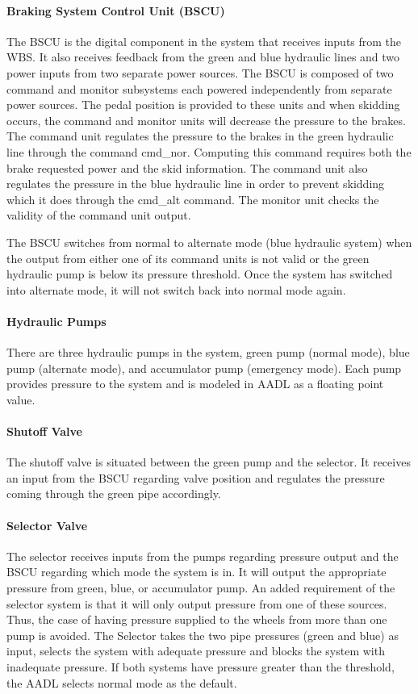 \paragraph{Braking System Control Unit (BSCU)}
The BSCU is the digital component in the system that receives inputs from the WBS. It also receives feedback from the green and blue hydraulic lines and two power inputs from two separate power sources. The BSCU is composed of two command and monitor subsystems each powered independently from separate power sources. The pedal position is provided to these units and when skidding occurs, the command and monitor units will decrease the pressure to the brakes.
The command unit regulates the pressure to the brakes in the green hydraulic line through the command cmd\_nor. Computing this command requires both the brake requested power and the skid information. The command unit also regulates the pressure in the blue hydraulic line in order to prevent skidding which it does through the cmd\_alt command. The monitor unit checks the validity of the command unit output.

The BSCU switches from normal to alternate mode (blue hydraulic system) when the output from either one of its command units is not valid or the green hydraulic pump is below its pressure threshold.  Once the system has switched into alternate mode, it will not switch back into normal mode again.

\paragraph{Hydraulic Pumps}
There are three hydraulic pumps in the system, green pump (normal mode), blue pump (alternate mode), and accumulator pump (emergency mode). Each pump provides pressure to the system and is modeled in AADL as a floating point value.

\paragraph{Shutoff Valve}

The shutoff valve is situated between the green pump and the selector. It receives an input from the BSCU regarding valve position and regulates the pressure coming through the green pipe accordingly.

\paragraph{Selector Valve}
The selector receives inputs from the pumps regarding pressure output and the BSCU regarding which mode the system is in. It will output the appropriate pressure from green, blue, or accumulator pump. An added requirement of the selector system is that it will only output pressure from one of these sources. Thus, the case of having pressure supplied to the wheels from more than one pump is avoided. The Selector takes the two pipe pressures (green and blue) as input, selects the system with adequate pressure and blocks the system with inadequate pressure. If both systems have pressure greater than the threshold, the AADL selects normal mode as the default.


